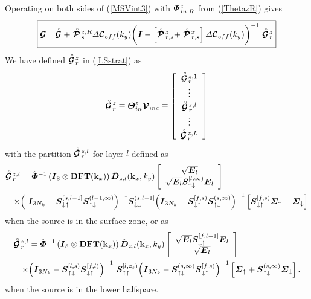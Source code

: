 Operating on both sides of (\ref{MSVint3}) with ${\mbox{\boldmath$\mit \Psi$\unboldmath}}^{z}_{in,R}$ from (\ref{ThetazR}) gives
\begin{equation} \label{LSstrat}
\fbox{$\displaystyle
{\mbox{\boldmath$\cal G$\unboldmath}}=\stackrel{\scriptscriptstyle _{\,\,\circ}}{ \mbox{\boldmath$\cal G$\unboldmath}}+
\stackrel{\scriptscriptstyle _{\,\,\circ}}{ \mbox{\boldmath$\cal P$\unboldmath}}\!{}^{z,R}_{s} 
{\mit \Delta}{\mbox{\boldmath$\cal C$\unboldmath}}{}_{eff}(k_y)
\bigg({\mbox{\boldmath$\mit I$\unboldmath}} -  
\left[\stackrel{\scriptscriptstyle _{\,\,\circ}}{ \mbox{\boldmath$\cal P$\unboldmath}}\!{}^{z}_{r,s}+\stackrel{\scriptscriptstyle _{\,\,\circ}}{ \mbox{\boldmath$\cal P$\unboldmath}}\!{}^{x}_{r,s}\right]
{\mit \Delta}{\mbox{\boldmath$\cal C$\unboldmath}}{}_{eff}(k_y)\bigg)^{-1} 
\stackrel{\scriptscriptstyle _{\,\,\circ}}{ \mbox{\boldmath$\cal G$\unboldmath}}\!{}^{z}_{r}
$}
\end{equation}
We have defined $\stackrel{\scriptscriptstyle _{\,\,\circ}}{ \mbox{\boldmath$\cal G$\unboldmath}}\!{}^{z}_{r}$ in (\ref{LSstrat}) as
\[
\stackrel{\scriptscriptstyle _{\,\,\circ}}{ \mbox{\boldmath$\cal G$\unboldmath}}\!{}^{z}_{r} \equiv {\mbox{\boldmath$\mit \Theta$\unboldmath}}^{z}_{in}{\mbox{\boldmath$\cal V$\unboldmath}}_{{inc}}\equiv
\left[\begin{array}{c}
\stackrel{\scriptscriptstyle _{\,\,\circ}}{ \mbox{\boldmath$\cal G$\unboldmath}}\!{}^{z,1}_{r}\\
\vdots\\
\stackrel{\scriptscriptstyle _{\,\,\circ}}{ \mbox{\boldmath$\cal G$\unboldmath}}\!{}^{z,l}_{r}\\
\vdots\\
\stackrel{\scriptscriptstyle _{\,\,\circ}}{ \mbox{\boldmath$\cal G$\unboldmath}}\!{}^{z,L}_{r}
\end{array}  \right]
\]
with the partition $\stackrel{\scriptscriptstyle _{\,\,\circ}}{ \mbox{\boldmath$\cal G$\unboldmath}}\!{}^{z,l}_{r}$ for  layer-$l$ defined as
\begin{eqnarray} \label{Gincdown}
\lefteqn{
\rf{\CB G}\!{}^{z,l}_{r}=\hat{\bmi \Phi}{}^{-1}\left({\bmi I}_8\otimes 
{\bf DFT}({\bf k}_{x}) \right)\hat{\bmi  D}_{z,l}({\bf k}_{x},{k}_{y})
\left[{\begin{array}{c}\sqrt{{\bmi E}_{l}}\\ 
\sqrt{{\bmi E}_{l}} {\bmi S}{}_{\uparrow\downarrow }^{[l, 
\infty)}{{\bmi E}}_{l}\end{array}}\right] 
}\\ 
&&
\times
{\left({\ {\bmi  I}_{ 3 N_k} -
{\bmi S}{}_{\downarrow\uparrow }^{({s} , {l-1} ]}{\bmi S}{}_{\uparrow 
\downarrow
}^{( {l-1} , \infty )} }\right)}^{-1} {\bmi S}{}_{\downarrow
\downarrow }^{( {s} , {l-1} ]}{\left({ {\bmi  I}_{ 3 N_k} - 
{\bmi S}{}_{\downarrow \uparrow }^{[ f , {s} )} {\bmi S}{}_{\uparrow
\downarrow }^{( {s} , \infty )} }\right)}^{-1}
\left[{\bmi S}{}_{\downarrow \uparrow }^{[f, {s})}{\bmi \Sigma}_{\uparrow}+ {\bmi 
\Sigma}_{\downarrow} \right]\nonumber
\end{eqnarray}
when the source is in the surface zone, or as
\begin{eqnarray} \label{Gincup}
\lefteqn{
\rf{\CB G}\!{}^{z,l}_{r}=
\hat{\bmi \Phi}{}^{-1}\left({\bmi I}_8\otimes 
{\bf DFT}({\bf k}_{x}) \right)\hat{\bmi  D}_{z,l}({\bf k}_{x},{k}_{y})
\left[{\begin{array}{c}
\sqrt{{\bmi E}_{l}}{\bmi S}{}_{\downarrow\uparrow }^{   [f,{l-1}]}{{\bmi E}}_{l}\\ 
\sqrt{{\bmi E}_{l}}\end{array}}\right] 
}\nonumber\\
&&
\times
{\left({\bmi  I}_{ 3 N_k}-
{\bmi S}{}_{\uparrow\downarrow }^{ [l,{s})} {\bmi S}{}_{\downarrow\uparrow 
}^{ 
[f,l)}\right)}^{-1}\
 {\bmi S}{}_{\uparrow\uparrow }^{ [l,z_{s})}
{\left({{\bmi  I}_{3 N_k}-{\bmi S}{}_{\uparrow\downarrow }^{ ({s},\infty)}
{{\bmi S}}{}_{\downarrow\uparrow }^{ [f,{s})}}\right)}^{-1}
\left[ {\bmi \Sigma}_{\uparrow} +
{\bmi S}{}_{\uparrow\downarrow }^{({s}, \infty)} {\bmi \Sigma}_{\downarrow}
\right].
\end{eqnarray}
when the source is in the lower halfspace.




